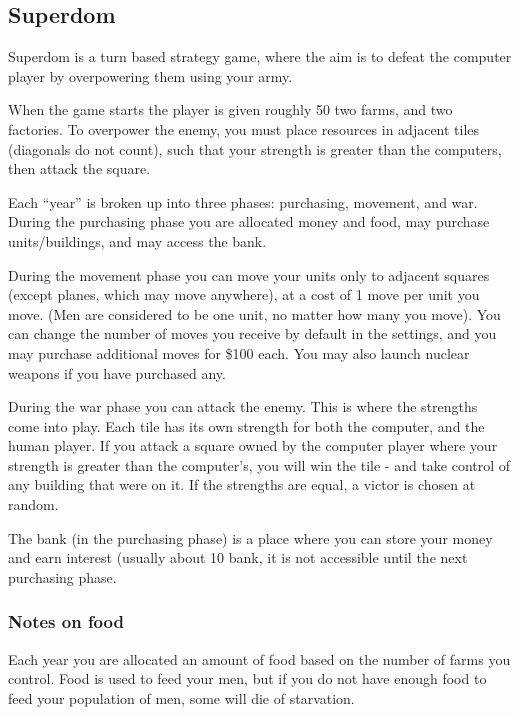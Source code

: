 \subsection{Superdom}

Superdom is a turn based strategy game, where the aim is to defeat the computer
player by overpowering them using your army.

When the game starts the player is given roughly 50%
two farms, and two factories. To overpower the enemy, you must place resources
in adjacent tiles (diagonals do not count), such that your strength is greater
than the computers, then attack the square.

Each ``year'' is broken up into three phases: purchasing, movement, and war.
During the purchasing phase you are allocated money and food, may purchase
units/buildings, and may access the bank.

During the movement phase you can move your units only to adjacent squares
(except planes, which may move anywhere), at a cost of 1 move per unit you move.
(Men are considered to be one unit, no matter how many you move). You can change
the number of moves you receive by default in the settings, and you may purchase
additional moves for \$100 each. You may also launch nuclear weapons if you have
purchased any.

During the war phase you can attack the enemy. This is where the strengths come
into play. Each tile has its own strength for both the computer, and the human
player. If you attack a square owned by the computer player where your strength
is greater than the computer's, you will win the tile - and take control of any
building that were on it. If the strengths are equal, a victor is chosen at
random.

The bank (in the purchasing phase) is a place where you can store your money
and earn interest (usually about 10%
bank, it is not accessible until the next purchasing phase.

\subsubsection{Notes on food}
Each year you are allocated an amount of food based on the number of farms you
control. Food is used to feed your men, but if you do not have enough food to
feed your population of men, some will die of starvation.

